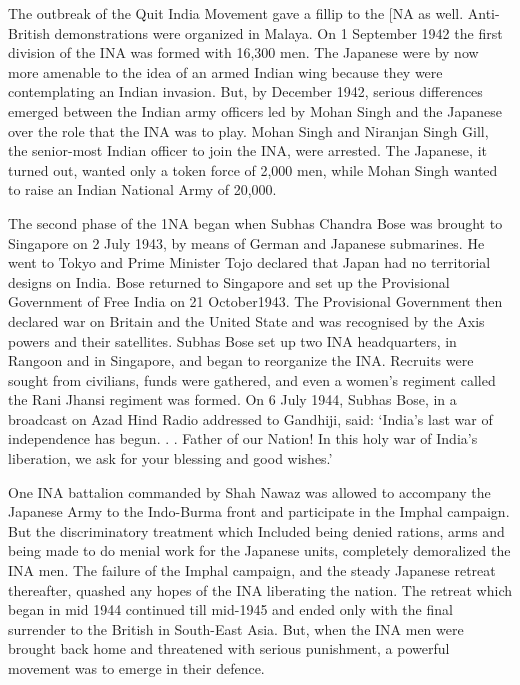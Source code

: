 The outbreak of the Quit India Movement gave a fillip to the [NA as well. Anti-British demonstrations were organized in Malaya. On 1 September 1942 the first division of the INA was formed with 16,300 men. The Japanese were by now more amenable to the idea of an armed Indian wing because they were contemplating an Indian invasion. But, by December 1942, serious differences emerged between the Indian army officers led by Mohan Singh and the Japanese over the role that the INA was to play. Mohan Singh and Niranjan Singh Gill, the senior-most Indian officer to join the INA, were arrested. The Japanese, it turned out, wanted only a token force of 2,000 men, while Mohan Singh wanted to raise an Indian National Army of 20,000.

The second phase of the 1NA began when Subhas Chandra Bose was brought to Singapore on 2 July 1943, by means of German and Japanese submarines. He went to Tokyo and Prime Minister Tojo declared that Japan had no territorial designs on India. Bose returned to Singapore and set up the Provisional Government of Free India on 21 October1943. The Provisional Government then declared war on Britain and the United State and was recognised by the Axis powers and their satellites. Subhas Bose set up two INA headquarters, in Rangoon and in Singapore, and began to reorganize the INA. Recruits were sought from civilians, funds were gathered, and even a women’s regiment called the Rani Jhansi regiment was formed. On 6 July 1944, Subhas Bose, in a broadcast on Azad Hind Radio addressed to Gandhiji, said: ‘India’s last war of independence has begun. . . Father of our Nation! In this holy war of India’s liberation, we ask for your blessing and good wishes.’

One INA battalion commanded by Shah Nawaz was allowed to accompany the Japanese Army to the Indo-Burma front and participate in the Imphal campaign. But the discriminatory treatment which Included being denied rations, arms and being made to do menial work for the Japanese units, completely demoralized the INA men. The failure of the Imphal campaign, and the steady Japanese retreat thereafter, quashed any hopes of the INA liberating the nation. The retreat which began in mid­ 1944 continued till mid-1945 and ended only with the final surrender to the British in South-East Asia. But, when the INA men were brought back home and threatened with serious punishment, a powerful movement was to emerge in their defence.
